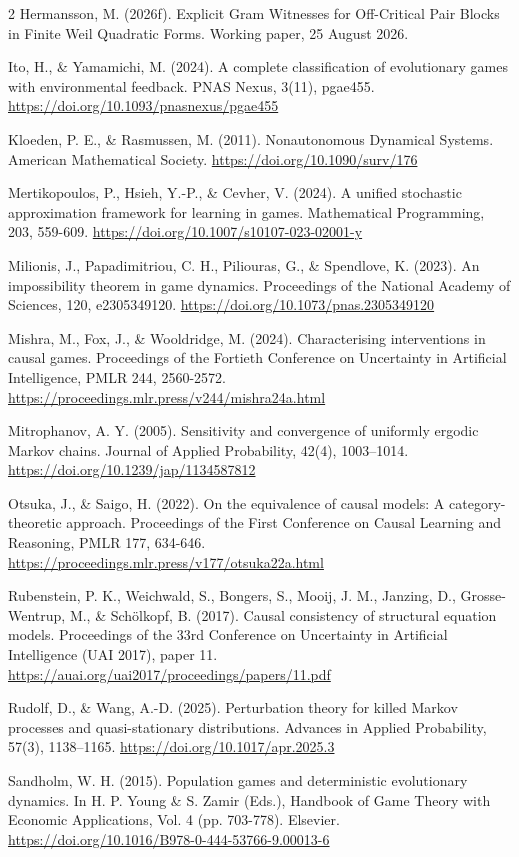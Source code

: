 \documentclass[10pt]{article}
\begin{document}
\begin{multicols}{2}
Hermansson, M. (2026f). Explicit Gram Witnesses for Off-Critical Pair Blocks in Finite Weil Quadratic Forms. Working paper, 25 August 2026.

Ito, H., \& Yamamichi, M. (2024). A complete classification of
evolutionary games with environmental feedback. PNAS Nexus, 3(11),
pgae455. \url{https://doi.org/10.1093/pnasnexus/pgae455}

Kloeden, P. E., \& Rasmussen, M. (2011). Nonautonomous Dynamical
Systems. American Mathematical Society. \url{https://doi.org/10.1090/surv/176}

Mertikopoulos, P., Hsieh, Y.-P., \& Cevher, V. (2024). A unified
stochastic approximation framework for learning in games. Mathematical
Programming, 203, 559-609. \url{https://doi.org/10.1007/s10107-023-02001-y}

Milionis, J., Papadimitriou, C. H., Piliouras, G., \& Spendlove, K.
(2023). An impossibility theorem in game dynamics. Proceedings of the
National Academy of Sciences, 120, e2305349120.
\url{https://doi.org/10.1073/pnas.2305349120}

Mishra, M., Fox, J., \& Wooldridge, M. (2024). Characterising
interventions in causal games. Proceedings of the Fortieth Conference on
Uncertainty in Artificial Intelligence, PMLR 244, 2560-2572.
\url{https://proceedings.mlr.press/v244/mishra24a.html}

Mitrophanov, A. Y. (2005). Sensitivity and convergence of uniformly ergodic Markov chains. Journal of Applied Probability, 42(4), 1003--1014. \url{https://doi.org/10.1239/jap/1134587812}

Otsuka, J., \& Saigo, H. (2022). On the equivalence of causal models: A
category-theoretic approach. Proceedings of the First Conference on Causal
Learning and Reasoning, PMLR 177, 634-646.
\url{https://proceedings.mlr.press/v177/otsuka22a.html}

Rubenstein, P. K., Weichwald, S., Bongers, S., Mooij, J. M., Janzing, D.,
Grosse-Wentrup, M., \& Schölkopf, B. (2017). Causal consistency of
structural equation models. Proceedings of the 33rd Conference on Uncertainty
in Artificial Intelligence (UAI 2017), paper 11.
\url{https://auai.org/uai2017/proceedings/papers/11.pdf}

Rudolf, D., \& Wang, A.-D. (2025). Perturbation theory for killed Markov processes and quasi-stationary distributions. Advances in Applied Probability, 57(3), 1138--1165. \url{https://doi.org/10.1017/apr.2025.3}

Sandholm, W. H. (2015). Population games and deterministic evolutionary
dynamics. In H. P. Young \& S. Zamir (Eds.), Handbook of Game Theory
with Economic Applications, Vol. 4 (pp. 703-778). Elsevier.
\url{https://doi.org/10.1016/B978-0-444-53766-9.00013-6}


\end{multicols}
\end{document}
